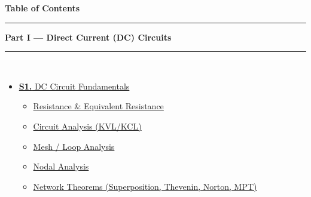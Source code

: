 \documentclass[12pt,a3paper]{article}
\begin{document}
\thispagestyle{fancy}
\begin{center}
  {\LARGE\bfseries\textcolor{pblue}{Table of Contents}}\\[6pt]
  \textcolor{pblue}{\rule{0.6\textwidth}{0.8pt}}
\end{center}
\vspace{6pt}

\begin{tcolorbox}[breakable,colback=cA!5,colframe=cA,boxrule=1pt,arc=5pt,
  left=8pt,right=8pt,top=8pt,bottom=8pt,before skip=4pt]
  {\large\bfseries\textcolor{cA}{Part I --- Direct Current (DC) Circuits}}\\[5pt]
  \textcolor{cA!40}{\rule{\textwidth}{0.4pt}}\\[3pt]
  \small\begin{itemize}[leftmargin=1.2em,itemsep=1pt,label={\textcolor{cA}{$\triangleright$}}]
    \item \hyperref[sec:S1]{\textbf{S1.} DC Circuit Fundamentals}
      \begin{itemize}[leftmargin=1.5em,itemsep=0pt,label={\textcolor{cA}{$\cdot$}}]
        \item \hyperref[sub:s1-resistance]{Resistance \& Equivalent Resistance}
        \item \hyperref[sub:s1-circuit]{Circuit Analysis (KVL/KCL)}
        \item \hyperref[sub:s1-mesh]{Mesh / Loop Analysis}
        \item \hyperref[sub:s1-nodal]{Nodal Analysis}
        \item \hyperref[sub:s1-theorems]{Network Theorems (Superposition, Thevenin, Norton, MPT)}
      \end{itemize}
  \end{itemize}
\end{tcolorbox}

\vspace{6pt}
\end{document}
